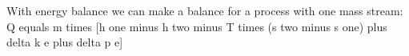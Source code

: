 With energy balance we can make a balance for a process with one mass stream:  
Q equals m times [h one minus h two minus T times (s two minus s one) plus delta k e plus delta p e]